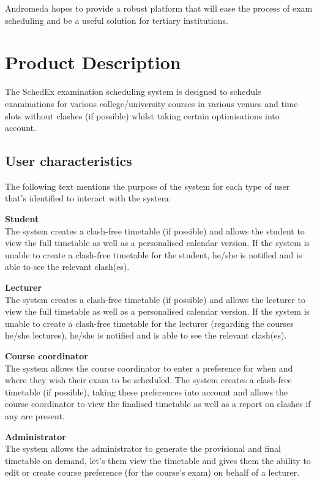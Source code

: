 \documentclass{article}
\begin{document}
Andromeda hopes to provide a robust platform that will ease the process of exam scheduling and be a useful solution for tertiary institutions.

\section{Product Description}

The SchedEx examination scheduling system is designed to schedule examinations for various college/university courses in various venues and time slots without clashes (if possible) whilst taking certain optimisations into account.

\subsection{User characteristics}

The following text mentions the purpose of the system for each type of user that's identified to interact with the system:

\textbf{Student} \\
The system creates a clash-free timetable (if possible) and allows the student to view the full timetable as well as a personalised calendar version. If the system is unable to create a clash-free timetable for the student, he/she is notified and is able to see the relevant clash(es).

\textbf{Lecturer} \\
The system creates a clash-free timetable (if possible) and allows the lecturer to view the full timetable as well as a personalised calendar version. If the system is unable to create a clash-free timetable for the lecturer (regarding the courses he/she lectures), he/she is notified and is able to see the relevant clash(es).

\textbf{Course coordinator} \\
The system allows the course coordinator to enter a preference for when and where they wish their exam to be scheduled. The system creates a clash-free timetable (if possible), taking these preferences into account and allows the course coordinator to view the finalised timetable as well as a report on clashes if any are present.

\textbf{Administrator} \\
The system allows the administrator to generate the provisional and final timetable on demand, let's them view the timetable and gives them the ability to edit or create course preference (for the course's exam) on behalf of a lecturer.
\end{document}
